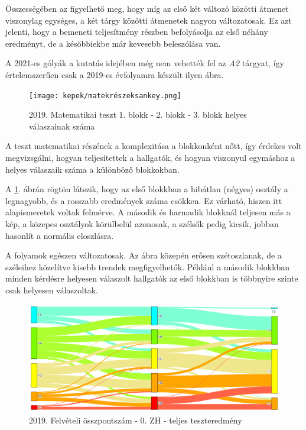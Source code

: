 \documentclass[12pt]{article}
\begin{document}
Összességében az figyelhető meg, hogy míg az első két változó közötti átmenet viszonylag egységes, a két tárgy közötti átmenetek nagyon változatosak. Ez azt jelenti, hogy a bemeneti teljesítmény részben befolyásolja az első néhány eredményt, de a későbbiekbe már kevesebb beleszólása van.

A 2021-es gólyák a kutatás idejében még nem vehették fel az \textit{A2} tárgyat, így értelemszerűen csak a 2019-es évfolyamra készült ilyen ábra.

\begin{figure}[H]
\centering
\texttt{[image: kepek/matekrészeksankey.png]}
\caption{2019. Matematikai teszt 1. blokk - 2. blokk - 3. blokk helyes válaszainak száma}
\label{fig:matekrészeksankey}
\end{figure}

A teszt matematikai részének a komplexitása a blokkonként nőtt, így érdekes volt megvizsgálni, hogyan teljesítettek a hallgatók, és hogyan viszonyul egymáshoz a helyes válaszaik száma a különböző blokkokban.

A \ref{fig:matekrészeksankey}. ábrán rögtön látszik, hogy az első blokkban a hibátlan (négyes) osztály a legnagyobb, és a rosszabb eredmények száma csökken. Ez várható, hiszen itt alapismeretek voltak felmérve. A második és harmadik blokknál teljesen más a kép, a közepes osztályok körülbelül azonosak, a szélsők pedig kicsik, jobban hasonlít a normális eloszlásra.

A folyamok egészen változatosak. Az ábra közepén erősen szétoszlanak, de a széleihez közelítve kisebb trendek megfigyelhetők. Például a második blokkban minden kérdésre helyesen válaszolt hallgatók az első blokkban is többnyire szinte csak helyesen válaszoltak.

\begin{figure}[H]
\centering
\includegraphics[scale=0.573]{kepek/2019_old_felvi_0zh_teszt.png}
\caption{2019. Felvételi összpontszám - 0. ZH - teljes teszteredmény}
\label{fig:2019_old_felvi_0zh_teszt}
\end{figure}
\end{document}

